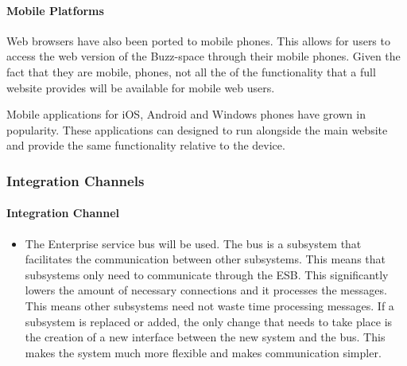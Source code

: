 \documentclass[10pt]{article}
\begin{document}
\paragraph{Mobile Platforms}
Web browsers have also been ported to mobile phones. This allows for users to access the web version of the Buzz-space through their mobile phones. Given the fact that they are mobile, phones, not all the of the functionality that a full website provides will be available for mobile web users.

Mobile applications for iOS, Android and Windows phones have grown in popularity. These applications can designed to run alongside the main website and provide the same functionality relative to the device. 


\subsubsection{Integration Channels}
\paragraph{Integration Channel}
\begin{itemize}
\item \hfill The Enterprise service bus will be used. The bus is a subsystem that facilitates the communication between other subsystems. This means that subsystems only need to communicate through the ESB. This significantly lowers the amount of necessary connections and it processes the messages. This means other subsystems need not waste time processing messages. If a subsystem is replaced or added, the only change that needs to take place is the creation of a new interface between the new system and the bus. This makes the system much more flexible and makes communication simpler.
\end{itemize}
\end{document}
